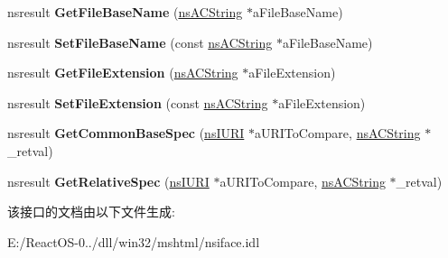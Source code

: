 \begin{DoxyCompactItemize}
\item 
\mbox{\label{interfacens_i_u_r_l_a81872a8fc77e70876863ee6a24509e40}} 
nsresult {\bfseries Get\+File\+Base\+Name} (\hyperlink{structns_c_string_container}{ns\+A\+C\+String} $\ast$a\+File\+Base\+Name)
\item 
\mbox{\label{interfacens_i_u_r_l_a8ab0a2c4438601702f8baab5f90d4e62}} 
nsresult {\bfseries Set\+File\+Base\+Name} (const \hyperlink{structns_c_string_container}{ns\+A\+C\+String} $\ast$a\+File\+Base\+Name)
\item 
\mbox{\label{interfacens_i_u_r_l_ab974cf4f6f650fe21ebc805525e8d3c2}} 
nsresult {\bfseries Get\+File\+Extension} (\hyperlink{structns_c_string_container}{ns\+A\+C\+String} $\ast$a\+File\+Extension)
\item 
\mbox{\label{interfacens_i_u_r_l_af29c907317c6201bced91ccab8c68e93}} 
nsresult {\bfseries Set\+File\+Extension} (const \hyperlink{structns_c_string_container}{ns\+A\+C\+String} $\ast$a\+File\+Extension)
\item 
\mbox{\label{interfacens_i_u_r_l_a9699fe37d7540d7af4d0afabb8ab83f0}} 
nsresult {\bfseries Get\+Common\+Base\+Spec} (\hyperlink{interfacens_i_u_r_i}{ns\+I\+U\+RI} $\ast$a\+U\+R\+I\+To\+Compare, \hyperlink{structns_c_string_container}{ns\+A\+C\+String} $\ast$\+\_\+retval)
\item 
\mbox{\label{interfacens_i_u_r_l_abf260a5071c004f37c25a869ea3a8863}} 
nsresult {\bfseries Get\+Relative\+Spec} (\hyperlink{interfacens_i_u_r_i}{ns\+I\+U\+RI} $\ast$a\+U\+R\+I\+To\+Compare, \hyperlink{structns_c_string_container}{ns\+A\+C\+String} $\ast$\+\_\+retval)
\end{DoxyCompactItemize}


该接口的文档由以下文件生成\+:\begin{DoxyCompactItemize}
\item 
E\+:/\+React\+O\+S-\/0../dll/win32/mshtml/nsiface.\+idl\end{DoxyCompactItemize}
